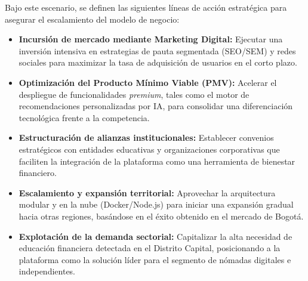 Bajo este escenario, se definen las siguientes líneas de acción estratégica para asegurar el escalamiento del modelo de negocio:

\begin{itemize}
	\item \textbf{Incursión de mercado mediante Marketing Digital:} Ejecutar una inversión intensiva en estrategias de pauta segmentada (SEO/SEM) y redes sociales para maximizar la tasa de adquisición de usuarios en el corto plazo.
	
	\item \textbf{Optimización del Producto Mínimo Viable (PMV):} Acelerar el despliegue de funcionalidades \textit{premium}, tales como el motor de recomendaciones personalizadas por IA, para consolidar una diferenciación tecnológica frente a la competencia.
	
	\item \textbf{Estructuración de alianzas institucionales:} Establecer convenios estratégicos con entidades educativas y organizaciones corporativas que faciliten la integración de la plataforma como una herramienta de bienestar financiero.
	
	\item \textbf{Escalamiento y expansión territorial:} Aprovechar la arquitectura modular y en la nube (Docker/Node.js) para iniciar una expansión gradual hacia otras regiones, basándose en el éxito obtenido en el mercado de Bogotá.
	
	\item \textbf{Explotación de la demanda sectorial:} Capitalizar la alta necesidad de educación financiera detectada en el Distrito Capital, posicionando a la plataforma como la solución líder para el segmento de nómadas digitales e independientes.
\end{itemize}